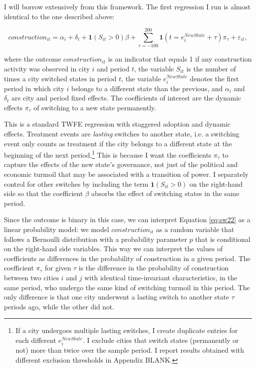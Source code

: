 \documentclass[11pt, a4paper]{article}
\begin{document}
I will borrow extensively from this framework. The first regression I run is almost identical to the one described above:

\begin{equation}
\label{eq:sw22}
    construction_{it} = \alpha_i + \delta_t + \mathbf{1}(S_{it} > 0)\beta + 
    \sum_{\tau = -100}^{200} \mathbf{1}(t = e^{NewState}_i + \tau)\pi_\tau + \varepsilon_{it},
\end{equation}

where the outcome $construction_{it}$ is an indicator that equals 1 if any construction activity was observed in city $i$ and period $t$, the variable $S_{it}$ is the number of times a city switched states in period $t$, the variable $e^{NewState}_i$ denotes the first period in which city $i$ belongs to a different state than the previous, and $\alpha_i$ and $\delta_t$ are city and period fixed effects. The coefficients of interest are the dynamic effects $\pi_\tau$ of switching to a new state permanently. 

This is a standard TWFE regression with staggered adoption and dynamic effects. Treatment events are \textit{lasting} switches to another state, i.e. a switching event only counts as treatment if the city belongs to a different state at the beginning of the next period.\footnote
{
    If a city undergoes multiple lasting switches, I create duplicate entries for each different $e^{NewState}_i$. I exclude cities that switch states (permanently or not) more than twice over the sample period. I report results obtained with different exclusion thresholds in Appendix BLANK.
}
This is because I want the coefficients $\pi_\tau$ to capture the effects of the new state's governance, not just of the political and economic turmoil that may be associated with a transition of power. I separately control for other switches by including the term $\mathbf{1}(S_{it} > 0)$ on the right-hand side so that the coefficient $\beta$ absorbs the effect of switching states in the same period.

Since the outcome is binary in this case, we can interpret Equation \eqref{eq:sw22} as a linear probability model: we model $construction_{it}$ as a random variable that follows a Bernoulli distribution with a probability parameter $p$ that is conditional on the right-hand side variables. This way we can interpret the values of coefficients as differences in the probability of construction in a given period. The coefficient $\pi_\tau$ for given $\tau$ is the difference in the probability of construction between two cities $i$ and $j$ with identical time-invariant characteristics, in the same period, who undergo the same kind of switching turmoil in this period. The only difference is that one city underwent a lasting switch to another state $\tau$ periods ago, while the other did not. 
\end{document}

